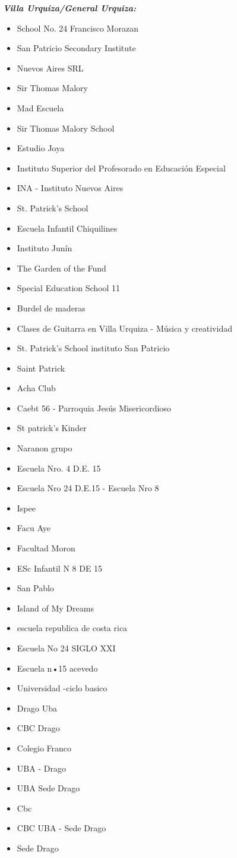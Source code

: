 \documentclass[a4paper, 10pt]{article}
\begin{document}
					\emph{\textbf{Villa Urquiza/General Urquiza:}}
					\begin{itemize}
					\item School No. 24 Francisco Morazan
\item San Patricio Secondary Institute
\item Nuevos Aires SRL
\item Sir Thomas Malory
\item Mad Escuela
\item Sir Thomas Malory School
\item Estudio Joya
\item Instituto Superior del Profesorado en Educación Especial
\item INA - Instituto Nuevos Aires
\item St. Patrick's School
\item Escuela Infantil Chiquilines
\item Instituto Junín
\item The Garden of the Fund
\item Special Education School 11
\item Burdel de maderas
\item Clases de Guitarra en Villa Urquiza - Música y creatividad
\item St. Patrick's School instituto San Patricio
\item Saint Patrick
\item Acha Club
\item Caebt 56 - Parroquia Jesús Misericordioso
\item St patrick's Kinder
\item Naranon grupo
\item Escuela Nro. 4 D.E. 15
\item Escuela Nro 24 D.E.15 - Escuela Nro 8
\item Ispee
\item Facu Aye
\item Facultad Moron
\item ESc Infantil N 8 DE 15
\item San Pablo
\item Island of My Dreams
\item escuela republica de costa rica
\item Escuela No 24 SIGLO XXI
\item Escuela n•15 acevedo
\item Universidad -ciclo basico
\item Drago Uba
\item CBC Drago
\item Colegio Franco
\item UBA - Drago
\item UBA Sede Drago
\item Cbc
\item CBC UBA - Sede Drago
\item Sede Drago
					\end{itemize}
					
\end{document}
